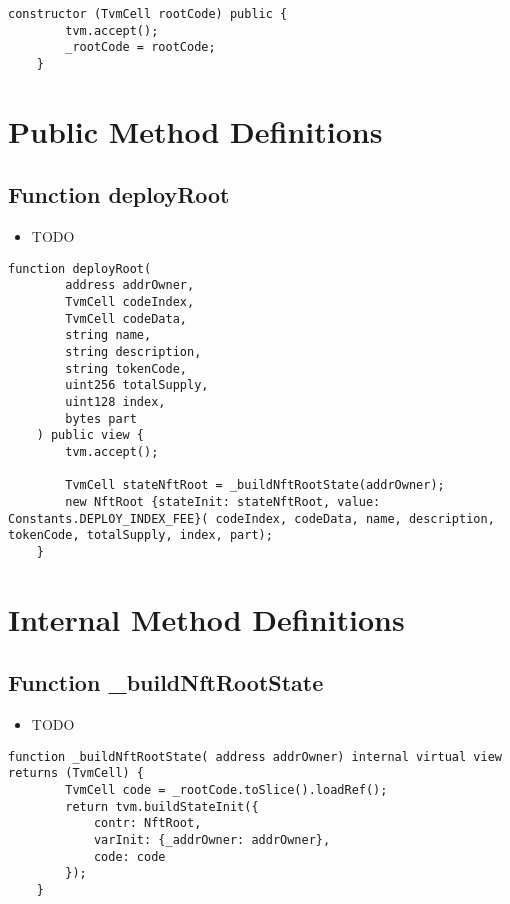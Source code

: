 \begin{lstlisting}[firstnumber=15]
    constructor (TvmCell rootCode) public {
        tvm.accept();
        _rootCode = rootCode;
    }
\end{lstlisting}

\section{Public Method Definitions}


\subsection{Function deployRoot}

\begin{itemize}
\item TODO
\end{itemize}

\begin{lstlisting}[firstnumber=20]
    function deployRoot(
        address addrOwner,
        TvmCell codeIndex,
        TvmCell codeData,
        string name,
        string description,
        string tokenCode,
        uint256 totalSupply,
        uint128 index,
        bytes part
    ) public view {
        tvm.accept();

        TvmCell stateNftRoot = _buildNftRootState(addrOwner);
        new NftRoot {stateInit: stateNftRoot, value: Constants.DEPLOY_INDEX_FEE}( codeIndex, codeData, name, description, tokenCode, totalSupply, index, part);
    }
\end{lstlisting}

\section{Internal Method Definitions}


\subsection{Function \_{}buildNftRootState}

\begin{itemize}
\item TODO
\end{itemize}

\begin{lstlisting}[firstnumber=37]
    function _buildNftRootState( address addrOwner) internal virtual view returns (TvmCell) {
        TvmCell code = _rootCode.toSlice().loadRef();
        return tvm.buildStateInit({
            contr: NftRoot,
            varInit: {_addrOwner: addrOwner},
            code: code
        });
    }
\end{lstlisting}
